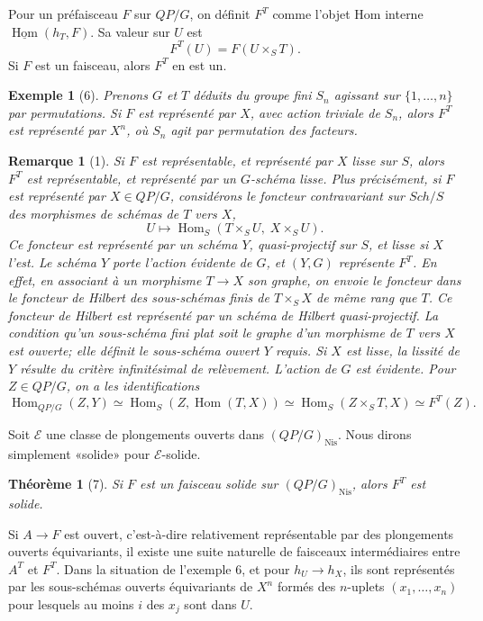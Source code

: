 \documentclass[11pt]{article}
\newcommand{\Nis}{\mathrm{Nis}}
\newcommand{\Hom}{\operatorname{Hom}}
\theoremstyle{deligne}
\newtheorem*{theorem*}{Théorème}
\newtheorem*{remark*}{Remarque}
\newtheorem*{example*}{Exemple}
\begin{document}
Pour un préfaisceau \(F\) sur \(QP/G\), on définit \(F^T\) comme l'objet Hom interne \(\underline{\Hom}(h_T,F)\). Sa valeur sur \(U\) est
\[
F^T(U)=F(U\times_S T).
\]
Si \(F\) est un faisceau, alors \(F^T\) en est un.

\begin{example*}[6]
Prenons \(G\) et \(T\) déduits du groupe fini \(S_n\) agissant sur \(\{1,\ldots,n\}\) par permutations. Si \(F\) est représenté par \(X\), avec action triviale de \(S_n\), alors \(F^T\) est représenté par \(X^n\), où \(S_n\) agit par permutation des facteurs.
\end{example*}

\begin{remark*}[1]
Si \(F\) est représentable, et représenté par \(X\) lisse sur \(S\), alors \(F^T\) est représentable, et représenté par un \(G\)-schéma lisse. Plus précisément, si \(F\) est représenté par \(X\in QP/G\), considérons le foncteur contravariant sur \(Sch/S\) des morphismes de schémas de \(T\) vers \(X\),
\[
U\longmapsto \Hom_S(T\times_S U,\; X\times_S U).
\]
Ce foncteur est représenté par un schéma \(Y\), quasi-projectif sur \(S\), et lisse si \(X\) l'est. Le schéma \(Y\) porte l'action évidente de \(G\), et \((Y,G)\) représente \(F^T\). En effet, en associant à un morphisme \(T\to X\) son graphe, on envoie le foncteur dans le foncteur de Hilbert des sous-schémas finis de \(T\times_S X\) de même rang que \(T\). Ce foncteur de Hilbert est représenté par un schéma de Hilbert quasi-projectif. La condition qu'un sous-schéma fini plat soit le graphe d'un morphisme de \(T\) vers \(X\) est ouverte; elle définit le sous-schéma ouvert \(Y\) requis. Si \(X\) est lisse, la lissité de \(Y\) résulte du critère infinitésimal de relèvement. L'action de \(G\) est évidente. Pour \(Z\in QP/G\), on a les identifications
\[
\Hom_{QP/G}(Z,Y)
\simeq \Hom_S(Z,\Hom(T,X))
\simeq \Hom_S(Z\times_S T,X)
\simeq F^T(Z).
\]
\end{remark*}

Soit \(\mathcal E\) une classe de plongements ouverts dans \((QP/G)_{\Nis}\). Nous dirons simplement «solide» pour \(\mathcal E\)-solide.

\begin{theorem*}[7]
Si \(F\) est un faisceau solide sur \((QP/G)_{\Nis}\), alors \(F^T\) est solide.
\end{theorem*}

Si \(A\to F\) est ouvert, c'est-à-dire relativement représentable par des plongements ouverts équivariants, il existe une suite naturelle de faisceaux intermédiaires entre \(A^T\) et \(F^T\). Dans la situation de l'exemple 6, et pour \(h_U\to h_X\), ils sont représentés par les sous-schémas ouverts équivariants de \(X^n\) formés des \(n\)-uplets \((x_1,\ldots,x_n)\) pour lesquels au moins \(i\) des \(x_j\) sont dans \(U\).
\end{document}
